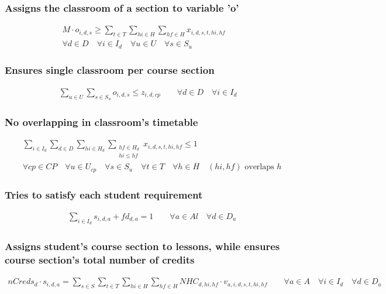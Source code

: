 \subsubsection{Assigns the classroom of a section to variable 'o'}
\begin{eqnarray}
M \cdot o_{i,d,s}  \geq \sum\limits_{t \in T}\sum\limits_{hi \in H}\sum\limits_{hf \in H} x_{i,d,s,t,hi,hf}  \nonumber \qquad 
\\
\forall d \in D \quad
\forall i \in I_{d} \quad
\forall u \in U \quad
\forall s \in S_{u} \quad
\end{eqnarray}

\subsubsection{Ensures single classroom per course section}
\begin{eqnarray}
\sum\limits_{u \in U} \sum\limits_{s \in S_{u}} o_{i,d,s}  \leq  z_{i,d,cp}  \nonumber \qquad 
\forall d \in D \quad
\forall i \in I_{d} \quad
\end{eqnarray}

\subsubsection{No overlapping in classroom's timetable}
\begin{eqnarray}
\sum\limits_{i \in I_{d}} \sum\limits_{d \in D} \sum\limits_{hi \in H_{d}} \sum_{\substack {hf \in H_{d} \\ hi\le hf}} x_{i,d,s,t,hi,hf}  \leq  1  \nonumber \qquad 
\\
\forall cp \in CP \quad
\forall u \in U_{cp} \quad
\forall s \in S_{u} \quad
\forall t \in T \quad
\forall h \in H \quad (hi,hf)\text{ overlaps }h
\end{eqnarray}

\subsubsection{Tries to satisfy each student requirement}
\begin{eqnarray}
\sum\limits_{i \in I_{d}} s_{i,d,a} + fd_{d,a} = 1  \nonumber \qquad 
\forall a \in Al \quad
\forall d \in D_{a}
\end{eqnarray}

\subsubsection{Assigns student's course section to lessons, while ensures course section's total number of credits}
\begin{eqnarray}
nCreds_{d} \cdot s_{i,d,a} = \sum\limits_{s \in S}\sum\limits_{t \in T}\sum\limits_{hi \in H}\sum\limits_{hf \in H} NHC_{d,hi,hf} \cdot v_{a,i,d,s,t,hi,hf} \nonumber \qquad 
\forall a \in A \quad
\forall i \in I_{d} \quad
\forall d \in D_{a}
\end{eqnarray}

